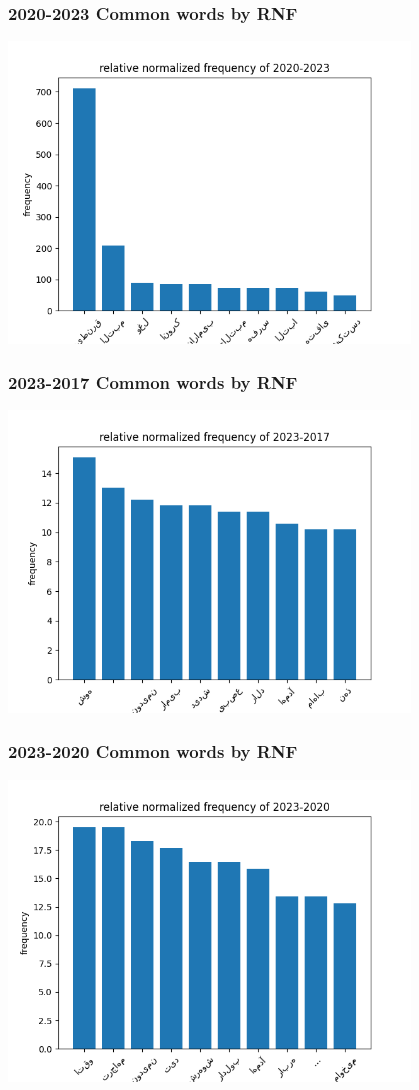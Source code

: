 \documentclass[a4paper]{article}
\begin{document}
\subsubsection{2020-2023 Common words by RNF}
\includegraphics[width=0.8\textwidth]{../stats/RNF/rnf20_23.png}
\subsubsection{2023-2017 Common words by RNF}
\includegraphics[width=0.8\textwidth]{../stats/RNF/rnf23_17.png}
\subsubsection{2023-2020 Common words by RNF}
\includegraphics[width=0.8\textwidth]{../stats/RNF/rnf23_20.png}
\end{document}
